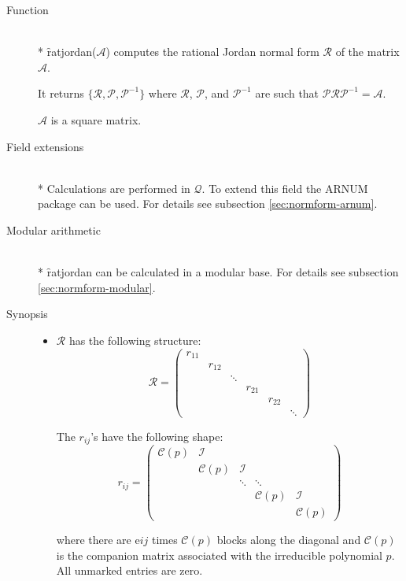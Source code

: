 \begin{description}
\item[Function]\mbox{}\\*
\f{ratjordan}($\mathcal{A}$) computes the rational Jordan normal form
$\mathcal{R}$ of the matrix $\mathcal{A}$.

It returns $\{\mathcal{R}, \mathcal{P}, \mathcal{P}^{-1}\}$ where $\mathcal{R}$,
$\mathcal{P}$, and $\mathcal{P}^{-1}$ are such that $\mathcal{P R P}^{-1} =
\mathcal{A}$.

$\mathcal{A}$ is a square matrix.

\item[Field extensions]\mbox{}\\*
Calculations are performed in $\mathcal{Q}$. To extend this field the
{\small ARNUM} package can be used. For details see subsection \ref{sec:normform-arnum}.

\item[Modular arithmetic]\mbox{}\\*
\f{ratjordan} can be calculated in a modular base. For details see
subsection \ref{sec:normform-modular}.

\item[Synopsis]

\begin{itemize}
\item $\mathcal{R}$ has the following structure:
      \[
      \mathcal{R} = \begin{pmatrix} r_{11} \\  &
      r_{12} \\  &  & \ddots \\  &  &  & r_{21}  \\ &  &
      &  &  r_{22} \\ &  &  &  &  & \ddots \end{pmatrix}
      \]

      The $r_{ij}$'s have the following shape:
      \[
      r_{ij} = \begin{pmatrix} \mathcal{C}(p) &
      \mathcal{I}  &  &  & \\  &  \mathcal{C}(p) & \mathcal{I}  & & \\ &
      & \ddots & \ddots & \\ &  &  &  \mathcal{C}(p) & \mathcal{I} \\ &
      &  &  & \mathcal{C}(p) \end{pmatrix}
      \]

      where there are e${ij}$ times $\mathcal{C}(p)$ blocks
      along the diagonal and $\mathcal{C}(p)$ is the companion
      matrix  associated with the irreducible polynomial $p$. All
      unmarked entries are zero.
\end{itemize}


\end{description}
